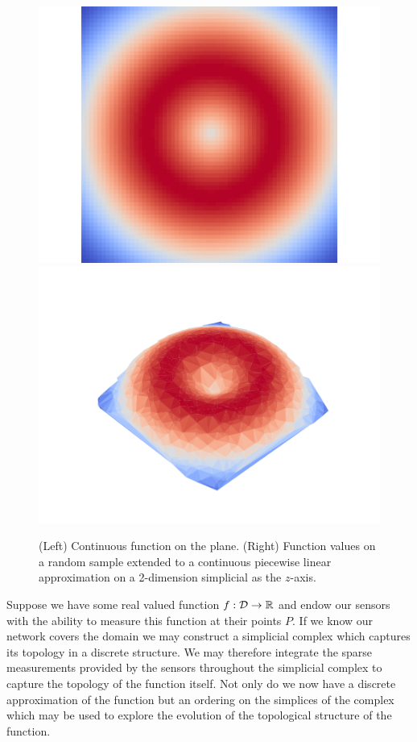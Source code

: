 \begin{figure}[htbp]
\centering
    \includegraphics[scale=0.45]{figures/fgrid.pdf}
    \includegraphics[scale=0.55]{figures/fcomplex.pdf}
    \caption{(Left) Continuous function on the plane.
            (Right) Function values on a random sample extended to a continuous piecewise linear approximation on a 2-dimension simplicial as the $z$-axis.}
    \label{fig:function}
\end{figure}

Suppose we have some real valued function $f:{\mathcal{D}}\to\mathbb{R}$ and endow our sensors with the ability to measure this function at their points $P$.
If we know our network covers the domain we may construct a simplicial complex which captures its topology in a discrete structure.
We may therefore integrate the sparse measurements provided by the sensors throughout the simplicial complex to capture the topology of the function itself.
Not only do we now have a discrete approximation of the function but an ordering on the simplices of the complex which may be used to explore the evolution of the topological structure of the function.

